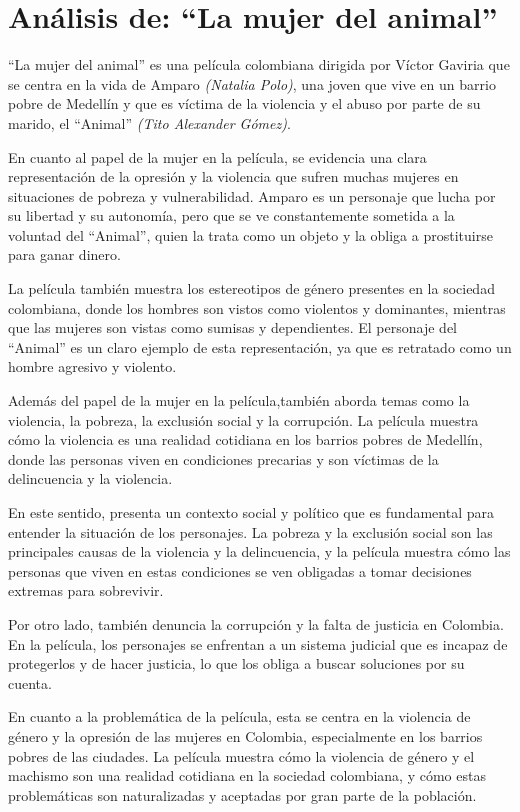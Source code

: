 \documentclass[letterpaper, 12pt]{report}
\begin{document}
\chapter*{Análisis de: ``La mujer del animal''}

\nocite{Pelicula}

``La mujer del animal'' es una película colombiana dirigida por Víctor Gaviria
que se centra en la vida de Amparo \textit{(Natalia Polo)}, una joven que vive en un
barrio pobre de Medellín y que es víctima de la violencia y el abuso por parte
de su marido, el ``Animal'' \textit{(Tito Alexander Gómez)}.

En cuanto al papel de la mujer en la película, se evidencia
una clara representación de la opresión y la violencia que
sufren muchas mujeres en situaciones de pobreza y
vulnerabilidad. Amparo es un personaje que lucha por su
libertad y su autonomía, pero que se ve constantemente
sometida a la voluntad del ``Animal'', quien la trata como
un objeto y la obliga a prostituirse para ganar dinero.

La película también muestra los estereotipos de género
presentes en la sociedad colombiana, donde los hombres son
vistos como violentos y dominantes, mientras que las
mujeres son vistas como sumisas y dependientes. El
personaje del ``Animal'' es un claro ejemplo de esta
representación, ya que es retratado como un hombre agresivo
y violento.

Además del papel de la mujer en la película,también aborda
temas como la violencia, la pobreza, la exclusión social y
la corrupción. La película muestra cómo la violencia es una
realidad cotidiana en los barrios pobres de Medellín, donde
las personas viven en condiciones precarias y son víctimas
de la delincuencia y la violencia.

En este sentido, presenta un contexto social y político que
es fundamental para entender la situación de los
personajes. La pobreza y la exclusión social son las
principales causas de la violencia y la delincuencia, y la
película muestra cómo las personas que viven en estas
condiciones se ven obligadas a tomar decisiones extremas
para sobrevivir.

Por otro lado, también denuncia la corrupción y la falta de
justicia en Colombia. En la película, los personajes se
enfrentan a un sistema judicial que es incapaz de
protegerlos y de hacer justicia, lo que los obliga a buscar
soluciones por su cuenta.

En cuanto a la problemática de la película, esta se centra
en la violencia de género y la opresión de las mujeres en
Colombia, especialmente en los barrios pobres de las
ciudades. La película muestra cómo la violencia de género y
el machismo son una realidad cotidiana en la sociedad
colombiana, y cómo estas problemáticas son naturalizadas y
aceptadas por gran parte de la población.
\end{document}
